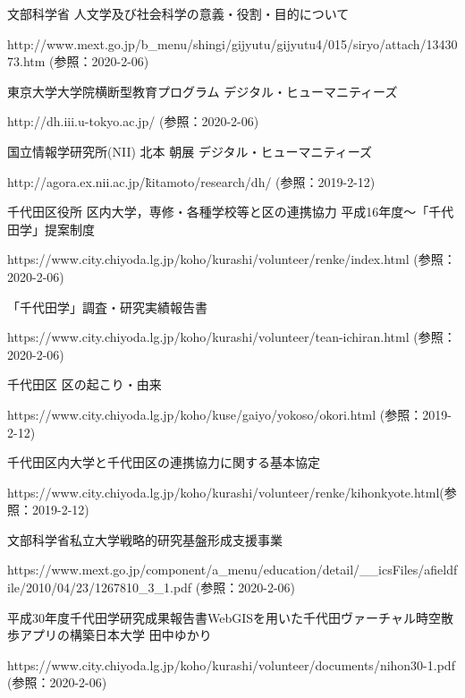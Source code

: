 \documentclass[a4paper, twoside]{jarticle}
\begin{document}
\begin{thebibliography}{99}

文部科学省 人文学及び社会科学の意義・役割・目的について\par
http://www.mext.go.jp/b\_menu/shingi/gijyutu/gijyutu4/015/siryo/attach/1343073.htm (参照：2020-2-06)

東京大学大学院横断型教育プログラム デジタル・ヒューマニティーズ\par
http://dh.iii.u-tokyo.ac.jp/ (参照：2020-2-06)

国立情報学研究所(NII) 北本 朝展 デジタル・ヒューマニティーズ\par
http://agora.ex.nii.ac.jp/\~kitamoto/research/dh/ (参照：2019-2-12)

千代田区役所 区内大学，専修・各種学校等と区の連携協力 平成16年度〜「千代田学」提案制度\par
https://www.city.chiyoda.lg.jp/koho/kurashi/volunteer/renke/index.html (参照：2020-2-06)

「千代田学」調査・研究実績報告書\par
https://www.city.chiyoda.lg.jp/koho/kurashi/volunteer/tean-ichiran.html (参照：2020-2-06)

千代田区 区の起こり・由来\par
https://www.city.chiyoda.lg.jp/koho/kuse/gaiyo/yokoso/okori.html (参照：2019-2-12)

千代田区内大学と千代田区の連携協力に関する基本協定\par
https://www.city.chiyoda.lg.jp/koho/kurashi/volunteer/renke/kihonkyote.html(参照：2019-2-12)

文部科学省私立大学戦略的研究基盤形成支援事業\par
https://www.mext.go.jp/component/a\_menu/education/detail/\_\_icsFiles/afieldfile/2010/04/23/1267810\_3\_1.pdf (参照：2020-2-06)


平成30年度千代田学研究成果報告書WebGISを用いた千代田ヴァーチャル時空散歩アプリの構築日本大学 田中ゆかり\par
https://www.city.chiyoda.lg.jp/koho/kurashi/volunteer/documents/nihon30-1.pdf (参照：2020-2-06)


\end{thebibliography}
\end{document}

